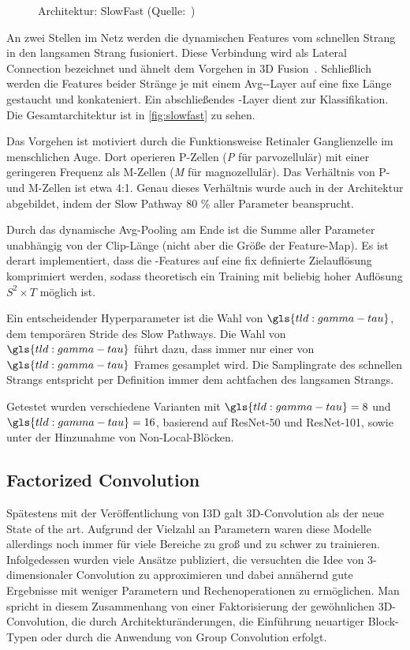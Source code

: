 \begin{figure}[h!]
    \centering
    \caption{Architektur: SlowFast (Quelle:~\cite{Feichtenhofer18})}
    \label{fig:slowfast}
\end{figure}

An zwei Stellen im Netz werden die dynamischen Features vom schnellen Strang in den langsamen Strang fusioniert.
Diese Verbindung wird als Lateral Connection bezeichnet und ähnelt dem Vorgehen in 3D Fusion~\cite{Feichtenhofer16}.
Schließlich werden die Features beider Stränge je mit einem Avg-\pool-Layer auf eine fixe Länge gestaucht und konkateniert.
Ein abschließendes \fc-Layer dient zur Klassifikation.
Die Gesamtarchitektur ist in \autoref{fig:slowfast} zu sehen.

Das Vorgehen ist motiviert durch die Funktionsweise Retinaler Ganglienzelle im menschlichen Auge.
Dort operieren P-Zellen (\emph{P} für parvozellulär) mit einer geringeren Frequenz als M-Zellen (\emph{M} für magnozellulär).
Das Verhältnis von P- und M-Zellen ist etwa 4:1.
Genau dieses Verhältnis wurde auch in der Architektur abgebildet, indem der Slow Pathway 80 \% aller Parameter beansprucht.

Durch das dynamische Avg-Pooling am Ende ist die Summe aller Parameter unabhängig von der Clip-Länge (nicht aber die Größe der Feature-Map).
Es ist derart implementiert, dass die \conv-Features auf eine fix definierte Zielauflösung komprimiert werden, sodass theoretisch ein Training mit beliebig hoher Auflösung $S^2 \times T$ möglich ist.

Ein entscheidender Hyperparameter ist die Wahl von $\gls{tld:gamma-tau}$, dem temporären Stride des Slow Pathways.
Die Wahl von $\gls{tld:gamma-tau}$ führt dazu, dass immer nur einer von $\gls{tld:gamma-tau}$ Frames gesamplet wird.
Die Samplingrate des schnellen Strangs entspricht per Definition immer dem achtfachen des langsamen Strangs.

Getestet wurden verschiedene Varianten mit $\gls{tld:gamma-tau} = 8$ und $\gls{tld:gamma-tau} = 16$, basierend auf ResNet-50 und ResNet-101, sowie unter der Hinzunahme von Non-Local-Blöcken.

\subsection{Factorized Convolution}
\label{subsec:factorized-convolution}

Spätestens mit der Veröffentlichung von I3D galt 3D-Convolution als der neue State of the art.
Aufgrund der Vielzahl an Parametern waren diese Modelle allerdings noch immer für viele Bereiche zu groß und zu schwer zu trainieren.
Infolgedessen wurden viele Ansätze publiziert, die versuchten die Idee von 3-dimensionaler Convolution zu approximieren und dabei annähernd gute Ergebnisse mit weniger Parametern und Rechenoperationen zu ermöglichen.
Man spricht in diesem Zusammenhang von einer Faktorisierung der gewöhnlichen 3D-Convolution, die durch Architekturänderungen, die Einführung neuartiger Block-Typen oder durch die Anwendung von Group Convolution erfolgt.

